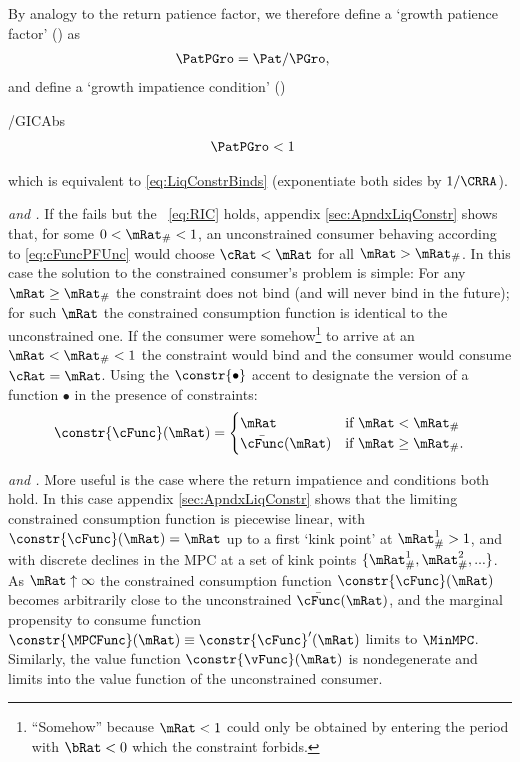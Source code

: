 \documentclass[BufferStockTheory]{subfiles}
\begin{document}
\hypertarget{PFGPNew}{}
\hypertarget{GICAbs}{}
By analogy to the return patience factor, we therefore define a `growth patience factor' (\PFGPNew) as
\begin{align}
  \PatPGro  & = {\Pat}/\PGro,  \label{eq:PFGPNew}
\end{align}
and define a `growth impatience condition' (\GICAbs)
\begin{verbatimwrite}{\EqDir/GICAbs}
\begin{align}
  \PatPGro &  < 1   \label{eq:GICAbs}
\end{align}
\end{verbatimwrite}

which is equivalent to \eqref{eq:LiqConstrBinds} (exponentiate both
sides by $1/\CRRA$).

\textit{\cncl{\GICAbs} and {\RIC}.}  If the {\GICAbs} fails but the \RIC~\eqref{eq:RIC} holds, appendix \ref{sec:ApndxLiqConstr} shows that, for some $0 < \mRat_{\#} < 1$, an unconstrained consumer behaving according to
\eqref{eq:cFuncPFUnc} would choose $\cRat < \mRat$ for all $\mRat >
\mRat_{\#}$.  In this case the solution to the constrained consumer's problem is simple: For any $\mRat
\geq \mRat_{\#}$ the constraint does not bind (and will never bind in
the future); for such $\mRat$ the constrained consumption function is identical
to the unconstrained one.  If the consumer were somehow\footnote{``Somehow'' because $\mRat<1$ could only be obtained by entering the period with $\bRat < 0$ which the constraint forbids.}
to arrive at an $\mRat < \mRat_{\#} < 1$ the constraint would bind and
the consumer would consume $\cRat=\mRat$.  Using the $\constr{\bullet}$ accent to designate the version of a function $\bullet$ in the presence of constraints:
\begin{equation}
  \constr{\cFunc}(\mRat)=
  \begin{cases}
    \mRat & \text{if $\mRat < \mRat_{\#}$} \\
    \bar{\cFunc}(\mRat)  & \text{if $\mRat \geq \mRat_{\#}$.}
  \end{cases}
\end{equation}

\textit{{\GICAbs} and {\RIC}.}  More useful is the case where the return impatience and {\GIC} conditions both hold.  In this case appendix \ref{sec:ApndxLiqConstr} shows that the limiting constrained consumption function is piecewise linear, with $\constr{\cFunc}(\mRat)=\mRat$ up to a first `kink point' at $\mRat_{\#}^{1}>1$, and with discrete declines in the MPC at a set of kink points $\{\mRat_{\#}^{1},\mRat_{\#}^{2},...\}$.  As $\mRat \uparrow \infty$ the constrained consumption function $\constr{\cFunc}(\mRat)$ becomes arbitrarily close to the unconstrained $\bar{\cFunc}(\mRat)$, and the marginal propensity to consume function $\constr{\MPCFunc}(\mRat) \equiv \constr{\cFunc}^{\prime}(\mRat)$ limits to $\MinMPC$.  Similarly, the value function $\constr{\vFunc}(\mRat)$ is nondegenerate and limits into the value function of the unconstrained consumer.
\end{document}
